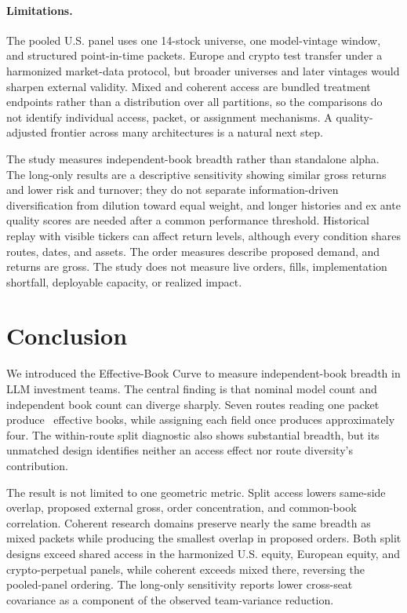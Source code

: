 \documentclass[sigconf]{acmart}
\begin{document}
\paragraph{Limitations.}
The pooled U.S. panel uses one 14-stock universe, one model-vintage window, and structured point-in-time packets. Europe and crypto test transfer under a harmonized market-data protocol, but broader universes and later vintages would sharpen external validity. Mixed and coherent access are bundled treatment endpoints rather than a distribution over all partitions, so the comparisons do not identify individual access, packet, or assignment mechanisms. A quality-adjusted frontier across many architectures is a natural next step.

The study measures independent-book breadth rather than standalone alpha. The long-only results are a descriptive sensitivity showing similar gross returns and lower risk and turnover; they do not separate information-driven diversification from dilution toward equal weight, and longer histories and ex ante quality scores are needed after a common performance threshold. Historical replay with visible tickers can affect return levels, although every condition shares routes, dates, and assets. The order measures describe proposed demand, and returns are gross. The study does not measure live orders, fills, implementation shortfall, deployable capacity, or realized impact.

\section{Conclusion}
We introduced the Effective-Book Curve to measure independent-book breadth in LLM investment teams. The central finding is that nominal model count and independent book count can diverge sharply. Seven routes reading one packet produce \SharedKSeven\ effective books, while assigning each field once produces approximately four. The within-route split diagnostic also shows substantial breadth, but its unmatched design identifies neither an access effect nor route diversity's contribution.

The result is not limited to one geometric metric. Split access lowers same-side overlap, proposed external gross, order concentration, and common-book correlation. Coherent research domains preserve nearly the same breadth as mixed packets while producing the smallest overlap in proposed orders. Both split designs exceed shared access in the harmonized U.S. equity, European equity, and crypto-perpetual panels, while coherent exceeds mixed there, reversing the pooled-panel ordering. The long-only sensitivity reports lower cross-seat covariance as a component of the observed team-variance reduction.
\end{document}
